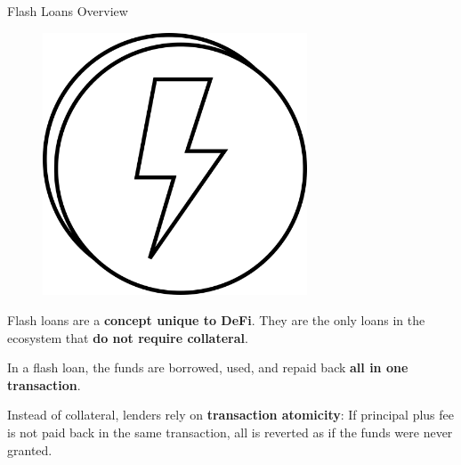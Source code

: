 \documentclass[]{beamer}
\begin{document}
\begin{frame}{Flash Loans Overview}

\begin{minipage}{0.3\textwidth}
	\begin{figure}
		\includegraphics[width=0.7\textwidth]{../assets/images/flashloan}	
	\end{figure}
\end{minipage}
\begin{minipage}{0.65\textwidth}
	Flash loans are a \textbf{concept unique to DeFi}. They are the only loans in the ecosystem that \textbf{do not require collateral}.
\end{minipage}

 {
\vspace{2em}
In a flash loan, the funds are borrowed, used, and repaid back \textbf{all in one transaction}.
}

\vspace{1em}

 {
Instead of collateral, lenders rely on \textbf{transaction atomicity}: If principal plus fee is not paid back in the same transaction, all is reverted as if the funds were never granted.
}

\end{frame}
\end{document}
